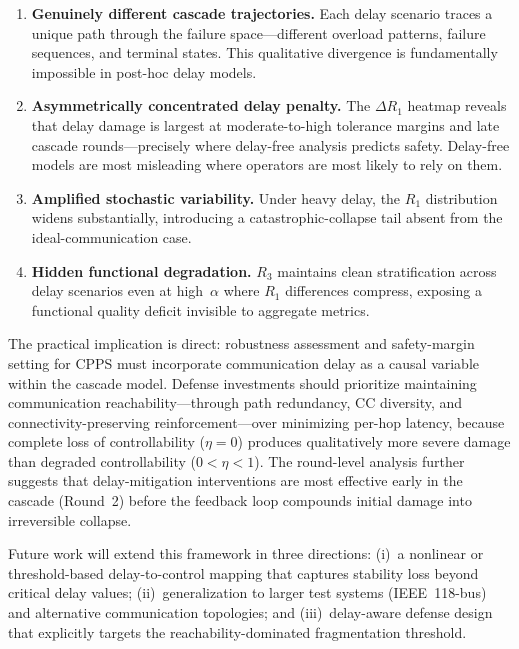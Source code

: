 \documentclass[a4paper,fleqn]{cas-dc}
\newcommand{\Rone}{R_1}
\newcommand{\Rthree}{R_3}
\begin{document}
\begin{enumerate}
\item \textbf{Genuinely different cascade trajectories.}  Each delay
  scenario traces a unique path through the failure space---different
  overload patterns, failure sequences, and terminal states.  This
  qualitative divergence is fundamentally impossible in post-hoc delay
  models.

\item \textbf{Asymmetrically concentrated delay penalty.}  The
  $\Delta\Rone$ heatmap reveals that delay damage is largest at
  moderate-to-high tolerance margins and late cascade rounds---precisely
  where delay-free analysis predicts safety.  Delay-free models are
  most misleading where operators are most likely to rely on them.

\item \textbf{Amplified stochastic variability.}  Under heavy delay,
  the $\Rone$ distribution widens substantially, introducing a
  catastrophic-collapse tail absent from the ideal-communication case.

\item \textbf{Hidden functional degradation.}  $\Rthree$ maintains
  clean stratification across delay scenarios even at high~$\alpha$
  where $\Rone$ differences compress, exposing a functional quality
  deficit invisible to aggregate metrics.
\end{enumerate}

The practical implication is direct: robustness assessment and
safety-margin setting for CPPS must incorporate communication delay as a
causal variable within the cascade model.  Defense investments should
prioritize maintaining communication reachability---through path
redundancy, CC diversity, and connectivity-preserving
reinforcement---over minimizing per-hop latency, because complete loss
of controllability ($\eta=0$) produces qualitatively more severe damage
than degraded controllability ($0<\eta<1$).  The round-level analysis
further suggests that delay-mitigation interventions are most effective
early in the cascade (Round~2) before the feedback loop compounds
initial damage into irreversible collapse.

Future work will extend this framework in three directions: (i)~a
nonlinear or threshold-based delay-to-control mapping that captures
stability loss beyond critical delay values; (ii)~generalization to
larger test systems (IEEE~118-bus) and alternative communication
topologies; and (iii)~delay-aware defense design that explicitly targets
the reachability-dominated fragmentation threshold.




\end{document}
